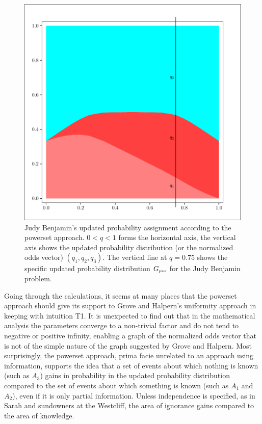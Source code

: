 \documentclass[12pt]{article}
\begin{document}
\begin{figure}[h]
  \begin{flushright}
    \begin{minipage}[h]{\lwv\linewidth}
      \includegraphics[width=\textwidth]{zeroone-pwst.pdf}
      \caption{Judy Benjamin's updated probability assignment
        according to the powerset approach. $0<q<1$ forms the
        horizontal axis, the vertical axis shows the updated
        probability distribution (or the normalized odds vector)
        $(q_{1},q_{2},q_{3})$. The vertical line at $q=0.75$ shows the
        specific updated probability distribution $G_{\mbox{\tiny
            pws}}$ for the Judy Benjamin problem.}
      \label{fig:pwst}
    \end{minipage}
  \end{flushright}
\end{figure}

Going through the calculations, it seems at many places that the
powerset approach should give its support to Grove and Halpern's
uniformity approach in keeping with intuition T1. It is unexpected to
find out that in the mathematical analysis the parameters converge to
a non-trivial factor and do not tend to negative or positive infinity,
enabling a graph of the normalized odds vector that is not of the
simple nature of the graph suggested by Grove and Halpern. Most
surprisingly, the powerset approach, prima facie unrelated to an
approach using information, supports the idea that a set of events
about which nothing is known (such as $A_{3}$) gains in probability in
the updated probability distribution compared to the set of events
about which something is known (such as $A_{1}$ and $A_{2}$), even if
it is only partial information. Unless independence is specified, as
in Sarah and sundowners at the Westcliff, the area of ignorance gains
compared to the area of knowledge.
\end{document}
